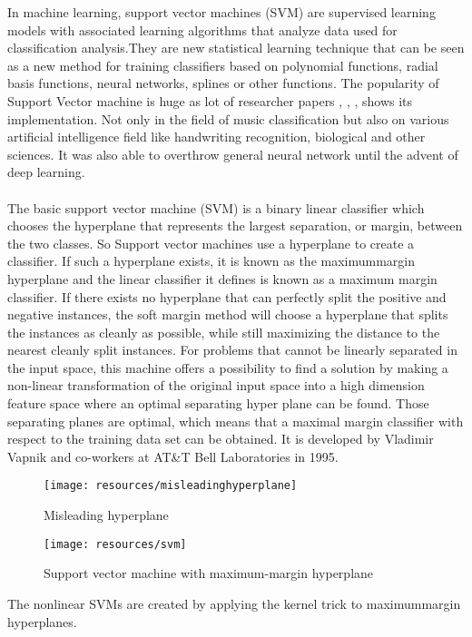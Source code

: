 In machine learning, support vector machines (SVM) are supervised learning models with 
associated learning algorithms that analyze data used for classification analysis.They are new statistical learning technique that can be seen as a new method for training
classifiers based on polynomial functions, radial basis functions, neural networks, splines or other functions. The popularity of Support Vector machine is huge as lot of researcher papers
\cite{Koerich2013}, \cite{Anglade2010}, \cite{Haggblade2011}, \cite{Kour2015} shows its implementation. Not only in the field of music classification but also on various artificial intelligence field like handwriting
recognition, biological and other sciences. It was also able to overthrow general neural network until the advent of deep learning.\\
\\
The basic support vector machine (SVM) is a binary linear classifier which chooses the hyperplane that represents the largest separation, or margin, between the two classes. So  Support vector machines use
a hyperplane to create a classifier. If such a hyperplane exists, it is known as the maximum­margin hyperplane and the linear classifier it defines is known as a maximum margin classifier. 
If there exists no hyperplane that can perfectly split the positive and negative instances, the soft 
margin method will choose a hyperplane that splits the instances as cleanly as possible, while still 
maximizing the distance to the nearest cleanly split instances. For problems that cannot be linearly separated in the input space, this machine offers a possibility to find a solution by making 
a non-linear transformation of the original input space into a high dimension feature space where an optimal separating hyper plane can be found. Those separating planes are optimal, which means
that a maximal margin classifier with respect to the training data set can be obtained. It is developed by Vladimir Vapnik and co-workers at AT\&T Bell Laboratories in 1995.\\
\begin{figure}[h!]
        \texttt{[image: resources/misleadinghyperplane]}
        \caption{Misleading hyperplane}
\end{figure}
\begin{figure}[h!]
        \texttt{[image: resources/svm]}
        \caption{Support vector machine with maximum-margin hyperplane}
\end{figure}
The nonlinear SVMs are created by applying the kernel trick to maximum­margin hyperplanes. 

